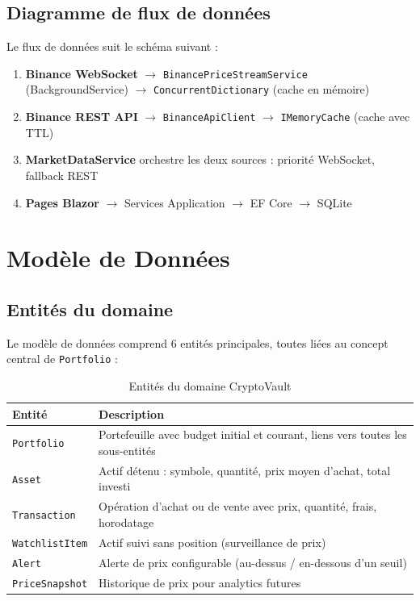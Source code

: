 \documentclass[12pt,a4paper]{article}
\begin{document}
\subsection{Diagramme de flux de données}

Le flux de données suit le schéma suivant :

\begin{enumerate}
    \item \textbf{Binance WebSocket} $\rightarrow$ \texttt{BinancePriceStreamService} (BackgroundService) $\rightarrow$ \texttt{ConcurrentDictionary} (cache en mémoire)
    \item \textbf{Binance REST API} $\rightarrow$ \texttt{BinanceApiClient} $\rightarrow$ \texttt{IMemoryCache} (cache avec TTL)
    \item \textbf{MarketDataService} orchestre les deux sources : priorité WebSocket, fallback REST
    \item \textbf{Pages Blazor} $\rightarrow$ Services Application $\rightarrow$ EF Core $\rightarrow$ SQLite
\end{enumerate}

\section{Modèle de Données}

\subsection{Entités du domaine}

Le modèle de données comprend 6 entités principales, toutes liées au concept central de \texttt{Portfolio} :

\begin{table}[H]
\centering
\caption{Entités du domaine CryptoVault}
\begin{tabularx}{\textwidth}{lX}
    \toprule
    \textbf{Entité} & \textbf{Description} \\
    \midrule
    \texttt{Portfolio} & Portefeuille avec budget initial et courant, liens vers toutes les sous-entités \\
    \texttt{Asset} & Actif détenu : symbole, quantité, prix moyen d'achat, total investi \\
    \texttt{Transaction} & Opération d'achat ou de vente avec prix, quantité, frais, horodatage \\
    \texttt{WatchlistItem} & Actif suivi sans position (surveillance de prix) \\
    \texttt{Alert} & Alerte de prix configurable (au-dessus / en-dessous d'un seuil) \\
    \texttt{PriceSnapshot} & Historique de prix pour analytics futures \\
    \bottomrule
\end{tabularx}
\end{table}
\end{document}
